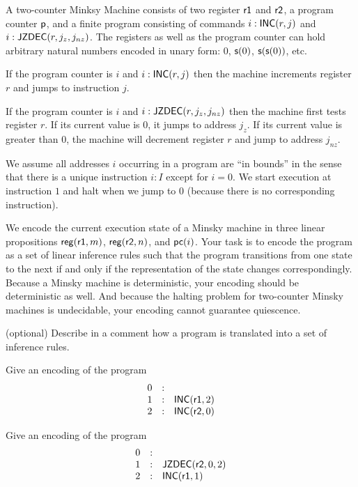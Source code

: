 \documentclass[11pt]{article}
\begin{document}
A two-counter Minksy Machine consists of two register $\mathsf{r1}$ and $\mathsf{r2}$, a program
counter $\mathsf{p}$, and a finite program consisting of commands $i : \mathsf{INC}(r, j)$ and
$i : \mathsf{JZDEC}(r, j_z, j_{nz})$.  The registers as well as the program counter can
hold arbitrary natural numbers encoded in unary form: $0$, $\mathsf{s}(0)$,
$\mathsf{s}(\mathsf{s}(0))$, etc.

If the program counter is $i$ and $i : \mathsf{INC}(r,j)$ then the machine increments register
$r$ and jumps to instruction $j$.

If the program counter is $i$ and $i : \mathsf{JZDEC}(r, j_z, j_{nz})$ then the machine
first tests register $r$.  If its current value is $0$, it jumps to address $j_z$.  If its
current value is greater than $0$, the machine will decrement register $r$ and jump to
address $j_{nz}$.

We assume all addresses $i$ occurring in a program are ``in bounds'' in the sense that
there is a unique instruction $i : I$ except for $i = 0$.  We start execution at
instruction $1$ and halt when we jump to $0$ (because there is no corresponding
instruction).

We encode the current execution state of a Minsky machine in three linear propositions
$\mathsf{reg}(\mathsf{r1}, m)$, $\mathsf{reg}(\mathsf{r2}, n)$, and $\mathsf{pc}(i)$.  Your task is to encode
the program as a set of linear inference rules such that the program transitions from one
state to the next if and only if the representation of the state changes correspondingly.
Because a Minsky machine is deterministic, your encoding should be deterministic as well.
And because the halting problem for two-counter Minsky machines is undecidable, your
encoding cannot guarantee quiescence.

\begin{task} (optional)
  Describe in a comment how a program is translated into a set of inference rules.
\end{task}

\begin{task}
  Give an encoding of the program
  \[
    \begin{array}{lcl}
      0 & : & \\
      1 & : & \mathsf{INC}(\mathsf{r1}, 2) \\
      2 & : & \mathsf{INC}(\mathsf{r2}, 0)
    \end{array}
  \]
\end{task}

\begin{task}
  Give an encoding of the program
  \[
    \begin{array}{lcl}
      0 & : & \\
      1 & : & \mathsf{JZDEC}(\mathsf{r2}, 0, 2) \\
      2 & : & \mathsf{INC}(\mathsf{r1}, 1)
    \end{array}
  \]
\end{task}
\end{document}
